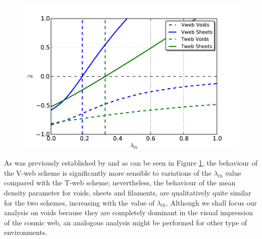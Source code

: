\documentclass[a4,useAMS,usenatbib,usegraphicx]{latex/mn2e}
\begin{document}
\begin{flushleft}
\begin{figure}
\centering

  \includegraphics[trim = 0mm 0mm 12mm 5mm, clip, keepaspectratio=true,
  width=0.35\textheight]{./figures/cell_types_density.pdf}


  \label{fig:mean_density}
  \vspace{0.1 cm}

\end{figure}
\end{flushleft}



As was previously established by  and as 
can be seen in Figure \ref{fig:mean_density}, the behaviour of the 
V-web scheme is significantly more sensible to variations of the 
$\lambda_{th}$ value compared with the T-web scheme; nevertheless, the 
behaviour of the mean density parameter for voids, sheets and filaments, 
are qualitatively quite similar for the two schemes, increasing with the 
value of $\lambda_{th}$. Although we shall focus our analysis on voids 
because they are completely dominant in the visual impression of the 
cosmic web, an analogous analysis might be performed for other type of 
environments.
\end{document}

